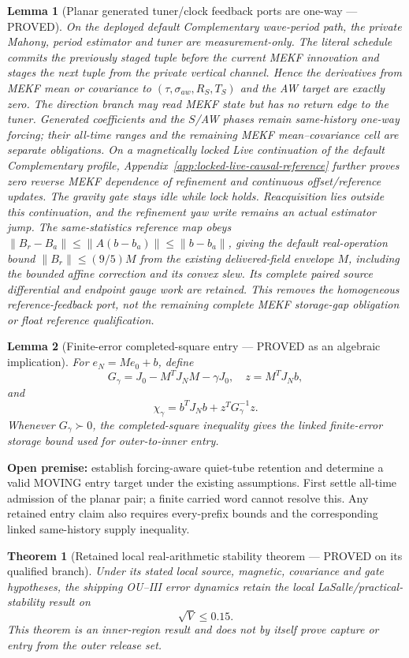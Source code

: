 \documentclass[journal]{IEEEtran}
\newtheorem{lemma}{Lemma}\newtheorem{theorem}{Theorem}\newtheorem{proposition}{Proposition}\newtheorem{remark}{Remark}\newtheorem{corollary}{Corollary}
\begin{document}
\begin{lemma}[Planar generated tuner/clock feedback ports are one-way --- PROVED]
On the deployed default Complementary wave-period path, the private Mahony,
period estimator and tuner are measurement-only.  The literal schedule commits
the previously staged tuple before the current MEKF innovation and stages the
next tuple from the private vertical channel.  Hence the derivatives from MEKF
mean or covariance to $(\tau,\sigma_{aw},R_S,T_S)$ and the AW target are
exactly zero.  The direction branch may read MEKF state but has no return edge
to the tuner.  Generated coefficients and the $S$/AW phases remain same-history
one-way forcing; their all-time ranges and the remaining MEKF mean--covariance
cell are separate obligations.
On a magnetically locked Live continuation of the default Complementary
profile, Appendix~\ref{app:locked-live-causal-reference} further proves zero
reverse MEKF dependence of refinement and continuous offset/reference updates.
The gravity gate stays idle while lock holds. Reacquisition lies outside this
continuation, and the refinement yaw write remains an actual estimator jump.
The same-statistics reference map obeys
$\|B_r-B_a\|\le\|A(b-b_a)\|\le\|b-b_a\|$, giving the default real-operation
bound $\|B_r\|\le(9/5)M$ from the existing delivered-field envelope $M$,
including the bounded affine correction and its convex slew.
Its complete paired source differential and endpoint gauge work are retained.
This removes the homogeneous reference-feedback port, not the remaining
complete MEKF storage-gap obligation or float reference qualification.
\end{lemma}

\begin{lemma}[Finite-error completed-square entry --- PROVED as an algebraic implication]
For \(e_N=Me_0+b\), define
\[
G_\gamma=J_0-M^TJ_NM-\gamma J_0,\quad z=M^TJ_Nb,
\]
and
\[
\chi_\gamma=b^TJ_Nb+z^TG_\gamma^{-1}z.
\]
Whenever \(G_\gamma\succ0\), the completed-square inequality gives the linked finite-error storage bound used for outer-to-inner entry.
\end{lemma}
\noindent\textbf{Open premise:} establish forcing-aware quiet-tube retention
and determine a valid MOVING entry target under the existing assumptions.
First settle all-time admission of the planar pair; a finite carried word
cannot resolve this. Any retained entry claim also requires every-prefix
bounds and the corresponding linked same-history supply inequality.

\begin{theorem}[Retained local real-arithmetic stability theorem --- PROVED on its qualified branch]
Under its stated local source, magnetic, covariance and gate hypotheses, the shipping OU--III error dynamics retain the local LaSalle/practical-stability result on
\[
\sqrt V\le0.15.
\]
This theorem is an inner-region result and does not by itself prove capture or entry from the outer release set.
\end{theorem}
\end{document}

